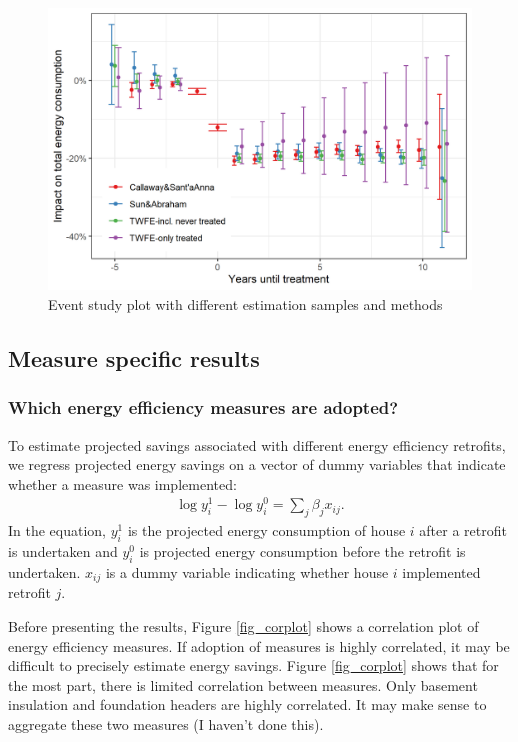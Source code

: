 \documentclass{article}
\begin{document}
\begin{figure}
	\includegraphics{../output_figures_tables/event_study_plot}
	\caption{Event study plot with different estimation samples and methods}\label{fig_esplot}
\end{figure}


\subsection{Measure specific results}

\subsubsection{Which energy efficiency measures are adopted?}
To estimate projected savings associated with different energy efficiency retrofits, we regress projected energy savings on a vector of dummy variables that indicate whether a measure was implemented:
\begin{align}
	\log y^1_i - \log y^0_i = \sum_j \beta_j x_{ij}.
\end{align}
In the equation, $y^1_i$ is the projected energy consumption of house $i$ after a retrofit is undertaken and $y^0_i$ is projected energy consumption before the retrofit is undertaken. $x_{ij}$ is a dummy variable indicating whether house $i$ implemented retrofit $j$.

Before presenting the results, Figure \ref{fig_corplot} shows a correlation plot of energy efficiency measures. If adoption of measures is highly correlated, it may be difficult to precisely estimate energy savings.  Figure \ref{fig_corplot} shows that for the most part, there is limited correlation between measures.  Only basement insulation and foundation headers are highly correlated.  It may make sense to aggregate these two measures (I haven't done this).
\end{document}
